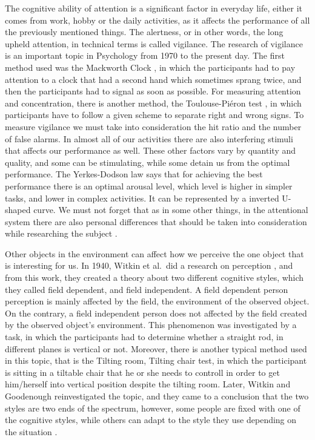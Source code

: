 The cognitive ability of attention is a significant factor in everyday life, either it comes from work, hobby or the daily activities, 
as it affects the performance of all the previously mentioned things. 
The alertness, or in other words, the long upheld attention, in technical terms is called vigilance. 
The research of vigilance is an important topic in Psychology from 1970 to the present day. 
The first method used was the Mackworth Clock \cite{Mackworth}, in which the participants had to pay attention to a clock that had a second hand which sometimes sprang twice, and then the participants had to signal as soon as possible. 
For measuring attention and concentration, there is another method, 
the Toulouse-Piéron test \cite{ToulousePieron}, 
in which participants have to follow a given scheme to separate right and wrong signs. To measure vigilance we must take into consideration the hit ratio and the number of false alarms. In almost all of our activities there are also interfering stimuli that affects our performance as well. These other factors vary by quantity and quality, and some can be stimulating, 
while some detain us 
from the optimal performance. The Yerkes-Dodson law \cite{YerkesDodsonLaw} says that for achieving the best performance 
there is an optimal arousal level, which level is higher in simpler tasks, and lower in complex activities. 
It can be represented by a inverted U-shaped curve. 
We must not forget that as in some other things, in the attentional system there are also personal differences that 
should be taken into consideration while researching the subject \cite{AltPszichobook}. 

Other objects in the environment can affect how we perceive the one object that is interesting for us. 
In 1940, 
Witkin et al.\ did a research on perception \cite{WitkinEtAl}, and from this work, they created a theory about two different cognitive styles, which they called field dependent, and field independent. A field dependent person perception is mainly affected by the field, the environment of the observed object. On the contrary, a field independent person does not affected by the field created by the observed object’s environment. This phenomenon was investigated by a task, in which the participants had to determine whether a straight rod, 
in different planes is vertical or not.
Moreover, there is another typical method used in this topic, that is the Tilting room, Tilting chair test, 
in which the participant is sitting in a tiltable chair that he or she needs to controll in order to get him/herself into vertical position despite the tilting room. 
Later, Witkin and Goodenough reinvestigated the topic, 
and they came to a conclusion that the two styles 
are two ends of the spectrum, 
however, some people are fixed with one of the cognitive styles, 
while others can adapt to the style they use depending on the situation \cite{WitkinGoodenough}. 

